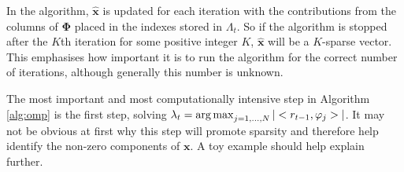 In the algorithm, $\hat{\boldsymbol{x}}$ is updated for each iteration with the contributions from the columns of $\boldsymbol{\Phi}$ placed in the indexes stored in $\Lambda_t$. So if the algorithm is stopped after the $K$th iteration for some positive integer $K$, $\boldsymbol{\hat{x}}$ will be a $K$-sparse vector. This emphasises how important it is to run the algorithm for the correct number of iterations, although generally this number is unknown. 

The most important and most computationally intensive step in Algorithm \ref{alg:omp} is the first step, solving $\lambda_t = \operatorname*{arg\,max}_{j=1,\hdots,N}|<r_{t-1}, \varphi_j>|$. It may not be obvious at first why this step will promote sparsity and therefore help identify the non-zero components of $\boldsymbol{x}$. A toy example should help explain further. 

